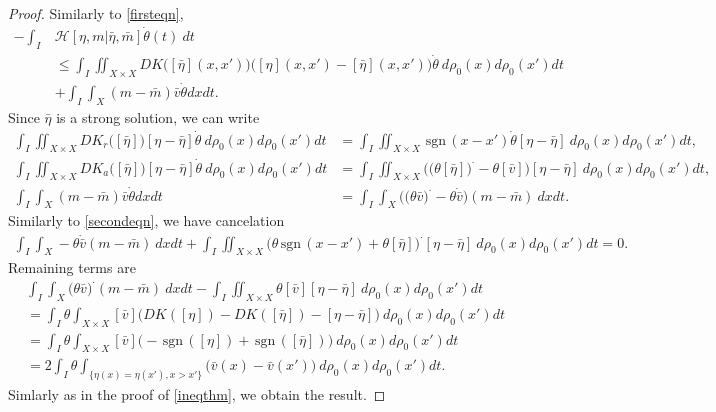 \documentclass[10pt, letterpaper]{article}
\def\H{{\mathcal{H}}}
\def\drr{{d\rho_0(x)d\rho_0(x')}}
\def\bdot{{\boldsymbol{\cdot}}}
\def\sgn{\,\textrm{sgn}\,}
\theoremstyle{definition}
\theoremstyle{remark}
\begin{document}
\begin{proof}
Similarly to \eqref{firsteqn},
\begin{align*}
        -\int_I &\H[\eta, {m} | \bar{\eta}, {\bar{m}}] \dot\theta(t)\:dt \\
        & \le \int_I\iint_{X \times X} D{K}\big([\bar{\eta}](x, x')\big)\big([\eta](x, x') - [\bar{\eta}](x, x')\big)\dot\theta \: \drr dt\\
        &  + \int_I\int_X ({m}-\bar{{m}})\bar{v}\dot\theta dxdt.
\end{align*}
Since $\bar\eta$ is a strong solution, we can write
\begin{align*}
        \int_I \iint_{X\times X} D{K}_r\big([\bar{\eta}]\big)[\eta-\bar{\eta}]\dot\theta \: \drr dt &= \int_I \iint_{X\times X} \sgn(x-x')\dot{\theta}[\eta - \bar\eta] \:\drr dt,\\
        \int_I \iint_{X\times X} D{K}_a\big([\bar{\eta}]\big)[\eta-\bar{\eta}]\dot\theta \: \drr dt &= \int_I \iint_{X\times X} \Big(\big(\theta[\bar\eta]\big)^\bdot-\theta[\bar v]\Big)[\eta - \bar\eta] \:\drr dt,\\
        \int_I\int_X ({m}-\bar{{m}})\bar{v}\dot\theta dxdt &= \int_I\int_X \Big(\big(\theta \bar{v}\big)^\bdot - \theta \dot{\bar{v}}\Big)({m}-\bar{{m}}) \: dxdt.
\end{align*}
Similarly to \eqref{secondeqn}, we have cancelation
\begin{align*}
 \int_I\int_X -\theta \dot{\bar{v}}(m-\bar m) \:dx dt +\int_I\iint_{X\times X} \big(\theta \sgn(x-x') + \theta[\bar\eta] \big)^\bdot [\eta-\bar\eta] \:\drr dt = 0.
\end{align*}
Remaining terms are
\begin{align*}
 &\int_I\int_X \big(\theta \bar{v}\big)^\bdot ({m}-\bar{{m}}) \:dxdt -\int_I\iint_{X\times X}\theta [\bar v][\eta-\bar\eta] \:\drr dt\\
 &= \int_I \theta \int_{X\times X} [\bar v] \Big( DK([\eta]) - DK([\bar\eta]) - [\eta-\bar\eta]\Big) \: \drr dt\\
 &=\int_I \theta \int_{X\times X} [\bar v] \big( -\sgn([\eta]) + \sgn([\bar\eta])\big)\: \drr dt\\
  &=2\int_I \theta \int_{\{\eta(x)=\eta(x'), x>x'\}} \big(\bar{v}(x) - \bar{v}(x')\big)\: \drr dt.
\end{align*}
Simlarly as in the proof of \eqref{ineqthm}, we obtain the result.
\end{proof}
\end{document}
